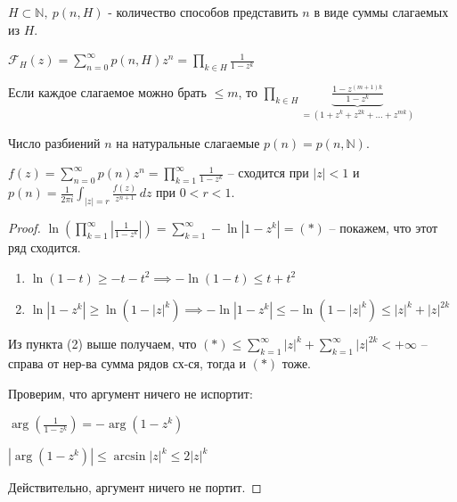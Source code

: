 \begin{definition}
    $H \subset \mathbb{N}, \ p(n, H)$ - количество способов представить $n$ в виде суммы слагаемых из $H$.

    $\mathcal{F}_{H}(z) = \sum_{n=0}^{\infty} p(n, H) z^n = \prod_{k \in H} \frac{1}{1 - z^k}$

    Если каждое слагаемое можно брать $\leqslant m$, то $\prod_{k \in H} \underbrace{\frac{1 - z^{(m+1)k}}{1 - z^k}}_{=(1 + z^k + z^{2k} + \dots + z^{mk})}$
\end{definition}

\begin{definition}
    Число разбиений $n$ на натуральные слагаемые $p(n) = p(n, \mathbb{N})$.
\end{definition}

\begin{theorem}
    $f(z) = \sum_{n = 0}^{\infty} p(n) z^n = \prod_{k=1}^{\infty} \frac{1}{1 - z^k}$ -- сходится при $|z| < 1$
    и $p(n) = \frac{1}{2\pi i} \int_{|z| = r} \frac{f(z)}{z^{n + 1}} \, dz$ при $0 < r < 1$.
\end{theorem}

\begin{proof}
    $\ln \left (\prod_{k=1}^{\infty} \left | \frac{1}{1 - z^k} \right | \right ) = \sum_{k=1}^{\infty} -\ln |1 - z^k| = (*)$ -- покажем, что этот ряд сходится.

    \begin{enumerate}
        \item $\ln{(1 - t)} \geq -t - t^2 \implies -\ln{(1 - t)} \leq t + t^2$
        \item $\ln{|1 - z^k|} \geq \ln{(1 - |z|^k)} \implies -\ln{|1 - z^k|} \leq -\ln{(1 - |z|^k)} \leq |z|^k + |z|^{2k}$
    \end{enumerate}

    Из пункта (2) выше получаем, что $(*) \leq \sum_{k=1}^{\infty} |z|^k + \sum_{k=1}^{\infty} |z|^{2k} < +\infty$ -- справа от нер-ва сумма рядов сх-ся, тогда и $(*)$ тоже.

    Проверим, что аргумент ничего не испортит:


    $\arg \left ( \frac{1}{1 - z^k} \right ) = -\arg (1 - z^k)$

    $|\arg (1 - z^k)| \leqslant \arcsin |z|^k \leqslant 2|z|^k$

    Действительно, аргумент ничего не портит.
\end{proof}

